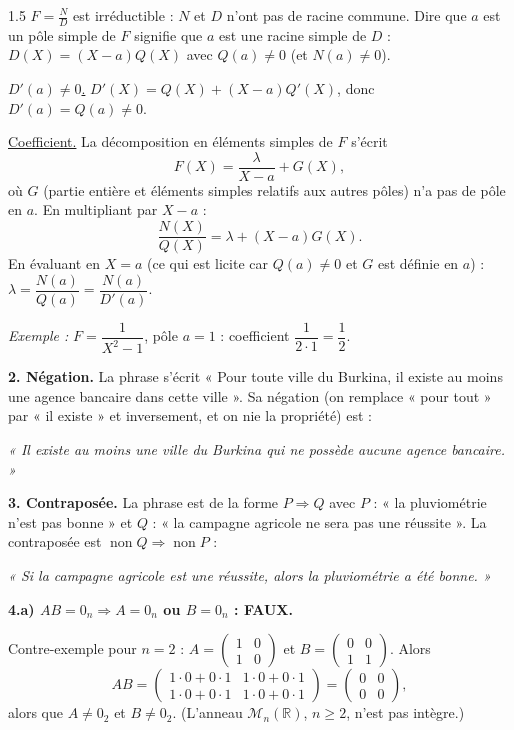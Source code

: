 \documentclass[12pt]{article}
\begin{document}
\begin{spacing}{1.5}
$F=\frac ND$ est irréductible : $N$ et $D$ n'ont pas de racine commune. Dire que $a$ est un pôle simple de $F$ signifie que $a$ est une racine simple de $D$ : $D(X)=(X-a)Q(X)$ avec $Q(a)\neq0$ (et $N(a)\neq0$).

\underline{$D'(a)\neq0$.} $D'(X)=Q(X)+(X-a)Q'(X)$, donc $D'(a)=Q(a)\neq0$.

\underline{Coefficient.} La décomposition en éléments simples de $F$ s'écrit
\[
F(X)=\frac{\lambda}{X-a}+G(X),
\]
où $G$ (partie entière et éléments simples relatifs aux autres pôles) n'a pas de pôle en $a$. En multipliant par $X-a$ :
\[
\frac{N(X)}{Q(X)}=\lambda+(X-a)G(X).
\]
En évaluant en $X=a$ (ce qui est licite car $Q(a)\neq0$ et $G$ est définie en $a$) : $\lambda=\dfrac{N(a)}{Q(a)}=\dfrac{N(a)}{D'(a)}$.

\emph{Exemple :} $F=\dfrac{1}{X^2-1}$, pôle $a=1$ : coefficient $\dfrac{1}{2\cdot1}=\dfrac12$.

\textbf{2. Négation.} La phrase s'écrit « Pour toute ville du Burkina, il existe au moins une agence bancaire dans cette ville ». Sa négation (on remplace « pour tout » par « il existe » et inversement, et on nie la propriété) est :
\begin{center}
\emph{« Il existe au moins une ville du Burkina qui ne possède aucune agence bancaire. »}
\end{center}

\textbf{3. Contraposée.} La phrase est de la forme $P\Rightarrow Q$ avec $P$ : « la pluviométrie n'est pas bonne » et $Q$ : « la campagne agricole ne sera pas une réussite ». La contraposée est $\operatorname{non}Q\Rightarrow\operatorname{non}P$ :
\begin{center}
\emph{« Si la campagne agricole est une réussite, alors la pluviométrie a été bonne. »}
\end{center}

\textbf{4.a) $AB=0_n\Rightarrow A=0_n$ ou $B=0_n$ : FAUX.}

Contre-exemple pour $n=2$ : $A=\begin{pmatrix}1&0\\1&0\end{pmatrix}$ et $B=\begin{pmatrix}0&0\\1&1\end{pmatrix}$. Alors
\[
AB=\begin{pmatrix}1\cdot0+0\cdot1&1\cdot0+0\cdot1\\1\cdot0+0\cdot1&1\cdot0+0\cdot1\end{pmatrix}=\begin{pmatrix}0&0\\0&0\end{pmatrix},
\]
alors que $A\neq0_2$ et $B\neq0_2$. (L'anneau $\mathcal{M}_n(\mathbb{R})$, $n\ge2$, n'est pas intègre.)


\end{spacing}
\end{document}
